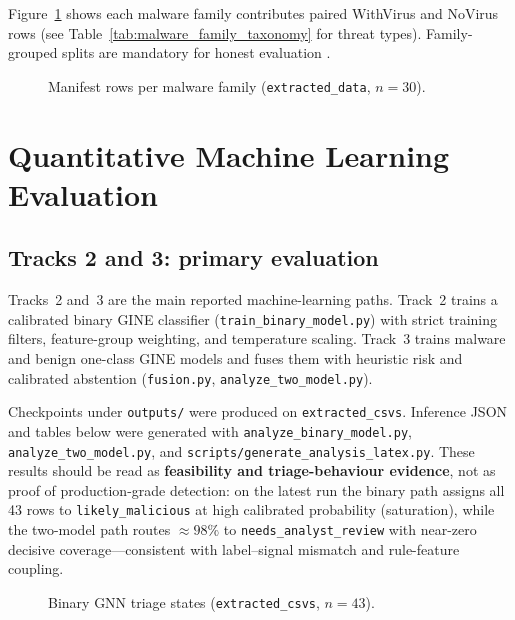 Figure~\ref{fig:family_coverage} shows each malware family contributes paired WithVirus and NoVirus rows (see Table~\ref{tab:malware_family_taxonomy} for threat types). Family-grouped splits are mandatory for honest evaluation \cite{sommer2010outside}.

\begin{figure}[htbp]
\centering

\caption{Manifest rows per malware family (\texttt{extracted\_data}, $n{=}30$).}
\label{fig:family_coverage}
\end{figure}

\section{Quantitative Machine Learning Evaluation}
\label{sec:quant_ml_eval}





\subsection{Tracks 2 and 3: primary evaluation}

Tracks~2 and~3 are the main reported machine-learning paths. Track~2 trains a calibrated binary GINE classifier (\texttt{train\_binary\_model.py}) with strict training filters, feature-group weighting, and temperature scaling. Track~3 trains malware and benign one-class GINE models and fuses them with heuristic risk and calibrated abstention (\texttt{fusion.py}, \texttt{analyze\_two\_model.py}).

Checkpoints under \texttt{outputs/} were produced on \texttt{extracted\_csvs}. Inference JSON and tables below were generated with \texttt{analyze\_binary\_model.py}, \texttt{analyze\_two\_model.py}, and \texttt{scripts/generate\_analysis\_latex.py}. These results should be read as \textbf{feasibility and triage-behaviour evidence}, not as proof of production-grade detection: on the latest run the binary path assigns all 43 rows to \texttt{likely\_malicious} at high calibrated probability (saturation), while the two-model path routes ${\approx}98\%$ to \texttt{needs\_analyst\_review} with near-zero decisive coverage---consistent with label--signal mismatch and rule-feature coupling.



\begin{figure}[htbp]
\centering

\caption{Binary GNN triage states (\texttt{extracted\_csvs}, $n{=}43$).}
\label{fig:binary_triage}
\end{figure}

